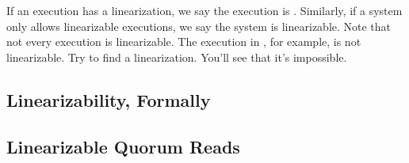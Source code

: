 If an execution has a linearization, we say the execution is
. Similarly, if a system only allows linearizable
executions, we say the system is linearizable. Note that not every execution is
linearizable. The execution in , for example, is
not linearizable. Try to find a linearization. You'll see that it's impossible.

{}

\subsection{Linearizability, Formally}

\subsection{Linearizable Quorum Reads}
